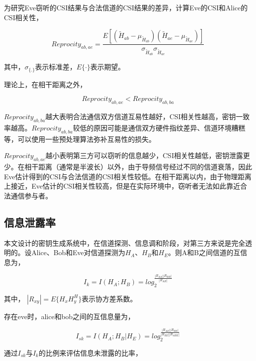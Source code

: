 \documentclass[master]{seuthesis} %
\begin{document}
\begin{Main}
为研究Eve窃听的CSI结果与合法信道的CSI结果的差异，计算Eve的CSI和Alice的CSI相关性，

\begin{equation}\label{equation_corr_ae}
    Reprocity_{ab, ae} = \frac{E[(\tilde{H}_{ab}-\mu_{\tilde{H}_{ab}})(\tilde{H}_{ae}-\mu_{\tilde{H}_{ae}})]}{\sigma_{\tilde{H}_{ab}}\sigma_{\tilde{H}_{ae}}}
\end{equation}

其中，$\sigma_{\{.\}}$表示标准差，$E\{\cdot\}$表示期望。

理论上，在相干距离之外，

\begin{equation}
    Reprocity_{ab, ae} < Reprocity_{ab, ba}
\end{equation}

$Reprocity_{ab, ba}$越大表明合法通信双方信道互易性越好，CSI相关性越高，密钥一致率越高。$Reprocity_{ab, ba}$较低的原因可能是通信双方硬件指纹差异、信道环境糟糕等，可以使用一些预处理算法弥补互易性的损失。

$Reprocity_{ab, ae}$越小表明第三方可以窃听的信息越少，CSI相关性越低，密钥泄露更少。在相干距离（通常是半波长）以外，由于导频信号经过不同的信道衰落，因此Eve估计得到的CSI与合法信道的CSI相关性较低。在相干距离以内，由于物理距离上接近，Eve估计的CSI相关性较高，但是在实际环境中，窃听者无法如此靠近合法通信参与者。

\subsection{信息泄露率}

本文设计的密钥生成系统中，在信道探测、信息调和阶段，对第三方来说是完全透明的\cite{sahin2016secure}。设Alice、Bob和Eve对信道探测为$H_A$、$H_B$和$H_E$。则A和B之间信道的互信息为，

\begin{equation}
    I_k = I(H_A; H_B) = log_2^{\frac{\left|R_{AA}\right|\left|R_{BB}\right|}{\left|R_{AB}\right|}}
\end{equation}

其中， $\left|R_{xy}\right| = E\{H_x H_y^H\}$表示协方差系数。

存在eve时，alice和bob之间的互信息量为， 

\begin{equation}
  I_{sk} = I(H_A; H_B | H_E) = log_2^{\frac{\left|R_{AE}\right|\left|R_{BE}\right|}{\left|R_{EE}\right|\left|R_{ABE}\right|}}
\end{equation}

通过$I_{sk}$与$I_k$的比例来评估信息未泄露的比率，


\end{Main}
\end{document}
